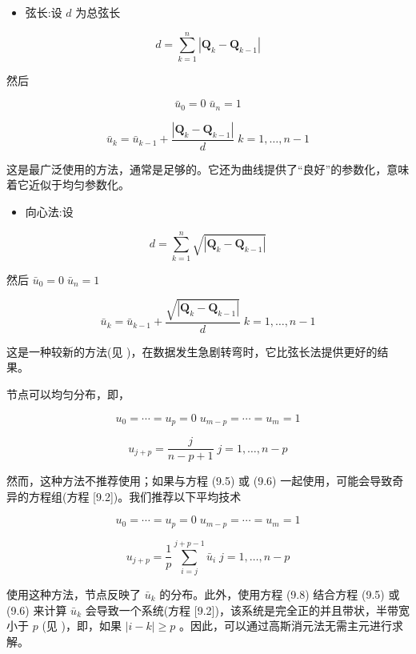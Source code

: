 \documentclass[../main.tex]{subfiles}
\begin{document}
\begin{itemize}
\item 弦长:设 \(d\) 为总弦长
\end{itemize}

\[
d = \mathop{\sum }\limits_{{k = 1}}^{n}\left| {{\mathbf{Q}}_{k} - {\mathbf{Q}}_{k - 1}}\right|  \tag{9.4}
\]

然后

\[
{\bar{u}}_{0} = 0\;{\bar{u}}_{n} = 1
\]

\[
{\bar{u}}_{k} = {\bar{u}}_{k - 1} + \frac{\left| {\mathbf{Q}}_{k} - {\mathbf{Q}}_{k - 1}\right| }{d}\;k = 1,\ldots ,n - 1 \tag{9.5}
\]

这是最广泛使用的方法，通常是足够的。它还为曲线提供了“良好”的参数化，意味着它近似于均匀参数化。

\begin{itemize}
\item 向心法:设
\end{itemize}

\[
d = \mathop{\sum }\limits_{{k = 1}}^{n}\sqrt{\left| {\mathbf{Q}}_{k} - {\mathbf{Q}}_{k - 1}\right| }
\]

然后 \({\bar{u}}_{0} = 0\;{\bar{u}}_{n} = 1\)

\[
{\bar{u}}_{k} = {\bar{u}}_{k - 1} + \frac{\sqrt{\left| {\mathbf{Q}}_{k} - {\mathbf{Q}}_{k - 1}\right| }}{d}\;k = 1,\ldots ,n - 1 \tag{9.6}
\]

这是一种较新的方法(见 \cite{Lee89})，在数据发生急剧转弯时，它比弦长法提供更好的结果。

节点可以均匀分布，即，

\[
{u}_{0} = \cdots  = {u}_{p} = 0\;{u}_{m - p} = \cdots  = {u}_{m} = 1
\]

\[
{u}_{j + p} = \frac{j}{n - p + 1}\;j = 1,\ldots ,n - p \tag{9.7}
\]

然而，这种方法不推荐使用；如果与方程 (9.5) 或 (9.6) 一起使用，可能会导致奇异的方程组(方程 [9.2])。我们推荐以下平均技术

\[
{u}_{0} = \cdots  = {u}_{p} = 0\;{u}_{m - p} = \cdots  = {u}_{m} = 1
\]

\[
{u}_{j + p} = \frac{1}{p}\mathop{\sum }\limits_{{i = j}}^{{j + p - 1}}{\bar{u}}_{i}\;j = 1,\ldots ,n - p \tag{9.8}
\]

使用这种方法，节点反映了 \({\bar{u}}_{k}\) 的分布。此外，使用方程 (9.8) 结合方程 (9.5) 或 (9.6) 来计算 \({\bar{u}}_{k}\) 会导致一个系统(方程 [9.2])，该系统是完全正的并且带状，半带宽小于 \(p\) (见 \cite{DeBo78})，即，如果 \(\left| {i - k}\right|  \geq  p\) 。因此，可以通过高斯消元法无需主元进行求解。
\end{document}
